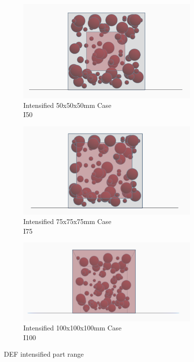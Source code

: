 \begin{figure}[!ht]
\centering
    \begin{subfigure}{.33\textwidth}
      \centering
      \includegraphics[width=.8\linewidth]{Files/DEF_X/X0_3ds.png}
      \caption{Intensified 50x50x50mm Case\\ I50}
    \end{subfigure}%
    \begin{subfigure}{.33\textwidth}
      \centering
      \includegraphics[width=.8\linewidth]{Files/DEF_X/X-5_3ds.png}
      \caption{Intensified 75x75x75mm Case \\ I75}
    \end{subfigure}%
    \begin{subfigure}{.33\textwidth}
      \centering
      \includegraphics[width=.9\linewidth]{Files/DEF_X/X-1_3ds.png}
      \caption{Intensified 100x100x100mm Case\\ I100}
    \end{subfigure}
  \caption{DEF intensified part range}
\end{figure}


